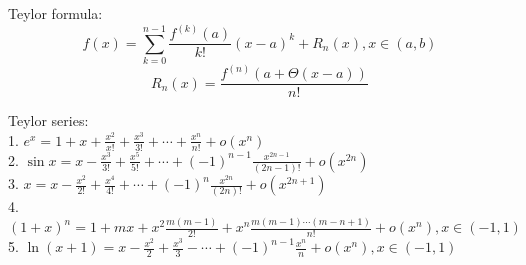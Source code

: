 \documentclass{letter}
\begin{document}
Teylor formula:
$$
f(x) = \sum_{k = 0}^{n - 1} \frac{f^{(k)} (a)}{k!} (x - a)^k + R_n(x), x \in (a, b)
$$
$$
R_n(x) = \frac{f^{(n)}(a + \Theta(x - a))}{n!} 
$$

Teylor series: \\
1. $e^x = 1 + x + \frac{x^2}{x!} + \frac{x^3}{3!} + \cdots + \frac{x^n}{n!} + o(x^n) $ \\
2. $ \sin{x} = x - \frac{x^3}{3!} + \frac{x^5}{5!} + \cdots + (-1)^{n-1}\frac{x^{2n-1}}{(2n-1)!} + o(x^{2n}) $ \\
3. $ x = x - \frac{x^2}{2!} + \frac{x^4}{4!} + \cdots + (-1)^n\frac{x^{2n}}{(2n)!} + o(x^{2n+1}) $ \\
4. $ (1+x)^n = 1 + mx + x^2\frac{m(m-1)}{2!} + x^n\frac{m(m-1)\cdots(m-n+1)}{n!} + o(x^n), x \in (-1,1) $ \\
5. $ \ln(x + 1) = x - \frac{x^2}{2} + \frac{x^3}{3} - \cdots + (-1)^{n-1}\frac{x^n}{n} + o(x^n), x \in (-1,1) $ \\
\end{document}
